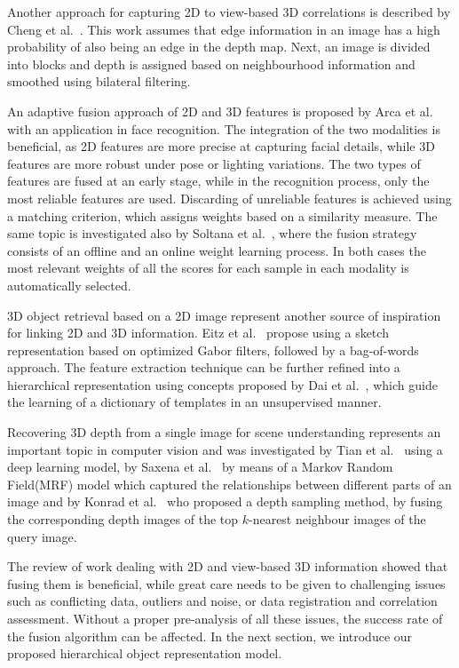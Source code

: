 \documentclass[runningheads]{llncs}
\begin{document}
Another approach for capturing 2D to view-based 3D correlations is described by Cheng et al.~\cite{Cheng2010}. This work assumes that edge information in an image has a high probability of also being an edge in the depth map. Next, an image is divided into blocks and depth is assigned based on neighbourhood information and smoothed using bilateral filtering.

An adaptive fusion approach of 2D and 3D features is proposed by Arca et al.~\cite{Arca2007} with an application in face recognition. The integration of the two modalities is beneficial, as 2D features are more precise at capturing facial details, while 3D features are more robust under pose or lighting variations. The two types of features are fused at an early stage, while in the recognition process, only the most reliable features are used. Discarding of unreliable features is achieved using a matching criterion, which assigns weights based on a similarity measure. The same topic is investigated also by Soltana et al.~\cite{Soltana2010}, where the fusion strategy consists of an offline and an online weight learning process. In both cases the most relevant weights of all the scores for each sample in each modality is automatically selected.

3D object retrieval based on a 2D image represent another source of inspiration for linking 2D and 3D information. Eitz et al.~\cite{Eitz2012} propose using a sketch representation based on optimized Gabor filters, followed by a bag-of-words approach. The feature extraction technique can be further refined into a hierarchical representation using concepts proposed by Dai et al.~\cite{Dai2014}, which guide the learning of a dictionary of templates in an unsupervised manner. 

Recovering 3D depth from a single image for scene understanding represents an important topic in computer vision and was investigated by Tian et al.~\cite{Tian2014} using a deep learning model, by Saxena et al.~\cite{Saxena2009} by means of a Markov Random Field(MRF) model which captured the relationships between different parts of an image and by Konrad et al.~\cite{Konrad2012} who proposed a depth sampling method, by fusing the corresponding depth images of the top $k$-nearest neighbour images of the query image.

The review of work dealing with 2D and view-based 3D information showed that fusing them is beneficial, while great care needs to be given to challenging issues such as conflicting data, outliers and noise, or data registration and correlation assessment. Without a proper pre-analysis of all these issues, the success rate of the fusion algorithm can be affected. In the next section, we introduce our proposed hierarchical object representation model.  
\end{document}
